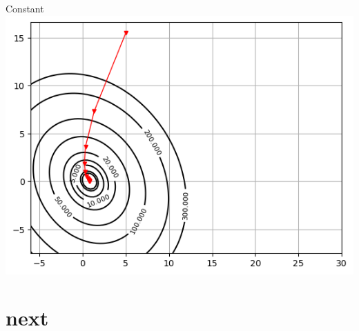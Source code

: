 \documentclass[12pt]{article}
\begin{document}
\begin{enumerate}
Constant
\includegraphics{exp1/strategies/3_constant.png}

\end{enumerate}

\section{next} %
\end{document}
